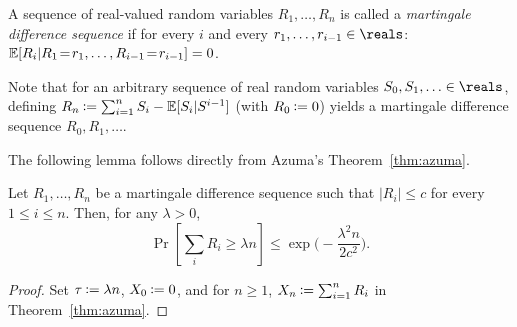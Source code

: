 \begin{definition} 
A sequence of real-valued random variables $R_1,\ldots,R_n$ is called
a \emph{martingale difference sequence} if for every $i$ and every
$r_1,\ldots,r_{i-1} \in \reals$: 
\mbox{$
\mathbb{E}[R_i | R_1\!=\!r_1,\ldots,R_{i-1}\!=\!r_{i-1}] =0
$}.
\end{definition}
Note that for an arbitrary sequence of real random variables $S_0, S_1, \ldots
\in \reals$, defining $R_n \assign \sum_{i=1}^n S_i - \E[S_i | S^{i-1}]$ (with $R_0 \assign 0$) yields
a martingale difference sequence $R_0, R_1, \ldots$.

The following lemma follows directly from Azuma's Theorem~\ref{thm:azuma}.
\begin{corollary}\label{cor:azuma} 
Let $R_1, \ldots, R_n$ be a martingale difference sequence such that
$|R_i| \leq c$ for every $1 \leq i \leq n$. Then, for any  $\lambda > 0$,
\[ \Pr\left[ \sum_i R_i \geq \lambda n \right] \leq
\exp{\bigl(-\frac{\lambda^2 n}{2 c^2}\bigr)}. \]
\end{corollary}
\begin{proof}
Set $\tau \assign \lambda n$, $X_0 \assign 0$, and for $n \geq 1$, $X_n \assign
\sum_{i=1}^n R_i$ in Theorem~\ref{thm:azuma}.
\end{proof}

